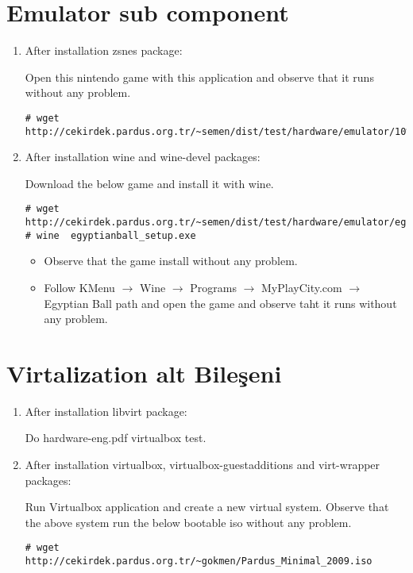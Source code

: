 \documentclass[a4paper,10pt]{article}
\begin{document}
\section{Emulator sub component}
\begin{enumerate}
 \item After installation zsnes package:

Open this nintendo game with this application and observe that it runs without any problem.
\begin{verbatim}
# wget http://cekirdek.pardus.org.tr/~semen/dist/test/hardware/emulator/10%20Yard%20Fight%20(A&S%20NES%20Hack).smc 
\end{verbatim}

 \item After installation wine and wine-devel packages:

Download the below game and install it with wine.  
\begin{verbatim}
# wget http://cekirdek.pardus.org.tr/~semen/dist/test/hardware/emulator/egyptianball_setup.exe
# wine  egyptianball_setup.exe
\end{verbatim}
\begin{itemize}
 \item Observe that the game install without any problem.
 \item Follow KMenu $\rightarrow$ Wine $\rightarrow$ Programs $\rightarrow$ MyPlayCity.com $\rightarrow$ Egyptian Ball path and open the game and observe taht it runs without any problem.
\end{itemize}

\end{enumerate}

\section{Virtalization alt Bileşeni}
\begin{enumerate}
 \item After installation libvirt package:

Do hardware-eng.pdf virtualbox test.
 \item After installation virtualbox, virtualbox-guestadditions and virt-wrapper packages:
 
Run Virtualbox application and create a new virtual system. Observe that the above system run the below bootable iso without any problem.
\begin{verbatim}
# wget http://cekirdek.pardus.org.tr/~gokmen/Pardus_Minimal_2009.iso
\end{verbatim}

\end{enumerate}
\end{document}
